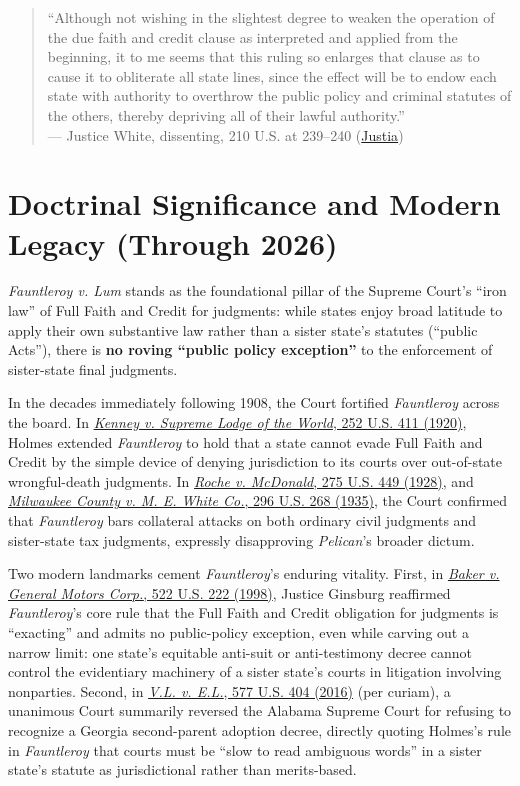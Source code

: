 \documentclass[12pt]{article}
\begin{document}
\begin{quote}
``Although not wishing in the slightest degree to weaken the operation of the due faith and credit clause as interpreted and applied from the beginning, it to me seems that this ruling so enlarges that clause as to cause it to obliterate all state lines, since the effect will be to endow each state with authority to overthrow the public policy and criminal statutes of the others, thereby depriving all of their lawful authority.'' \\
--- Justice White, dissenting, 210 U.S. at 239--240 (\href{https://supreme.justia.com/cases/federal/us/210/230/}{Justia})
\end{quote}

\section{Doctrinal Significance and Modern Legacy (Through 2026)}

\textit{Fauntleroy v. Lum} stands as the foundational pillar of the Supreme Court's ``iron law'' of Full Faith and Credit for judgments: while states enjoy broad latitude to apply their own substantive law rather than a sister state's statutes (``public Acts''), there is \textbf{no roving ``public policy exception''} to the enforcement of sister-state final judgments.

In the decades immediately following 1908, the Court fortified \textit{Fauntleroy} across the board. In \href{https://supreme.justia.com/cases/federal/us/252/411/}{\textit{Kenney v. Supreme Lodge of the World}, 252 U.S. 411 (1920)}, Holmes extended \textit{Fauntleroy} to hold that a state cannot evade Full Faith and Credit by the simple device of denying jurisdiction to its courts over out-of-state wrongful-death judgments. In \href{https://supreme.justia.com/cases/federal/us/275/449/}{\textit{Roche v. McDonald}, 275 U.S. 449 (1928)}, and \href{https://supreme.justia.com/cases/federal/us/296/268/}{\textit{Milwaukee County v. M. E. White Co.}, 296 U.S. 268 (1935)}, the Court confirmed that \textit{Fauntleroy} bars collateral attacks on both ordinary civil judgments and sister-state tax judgments, expressly disapproving \textit{Pelican}'s broader dictum.

Two modern landmarks cement \textit{Fauntleroy}'s enduring vitality. First, in \href{https://supreme.justia.com/cases/federal/us/522/222/}{\textit{Baker v. General Motors Corp.}, 522 U.S. 222 (1998)}, Justice Ginsburg reaffirmed \textit{Fauntleroy}'s core rule that the Full Faith and Credit obligation for judgments is ``exacting'' and admits no public-policy exception, even while carving out a narrow limit: one state's equitable anti-suit or anti-testimony decree cannot control the evidentiary machinery of a sister state's courts in litigation involving nonparties. Second, in \href{https://supreme.justia.com/cases/federal/us/577/464/}{\textit{V.L. v. E.L.}, 577 U.S. 404 (2016)} (per curiam), a unanimous Court summarily reversed the Alabama Supreme Court for refusing to recognize a Georgia second-parent adoption decree, directly quoting Holmes's rule in \textit{Fauntleroy} that courts must be ``slow to read ambiguous words'' in a sister state's statute as jurisdictional rather than merits-based.
\end{document}
